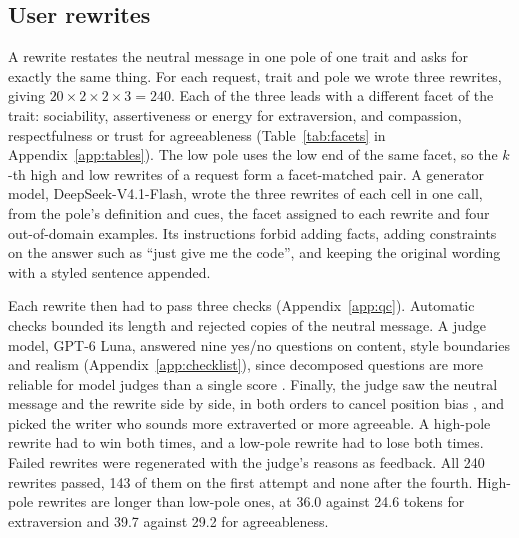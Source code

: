 \subsection{User rewrites}
A rewrite restates the neutral message in one pole of one trait and asks for exactly the same thing. For each request, trait and pole we wrote three rewrites, giving $20 \times 2 \times 2 \times 3 = 240$. Each of the three leads with a different facet of the trait: sociability, assertiveness or energy for extraversion, and compassion, respectfulness or trust for agreeableness (Table~\ref{tab:facets} in Appendix~\ref{app:tables}). The low pole uses the low end of the same facet, so the $k$-th high and low rewrites of a request form a facet-matched pair. A generator model, DeepSeek-V4.1-Flash, wrote the three rewrites of each cell in one call, from the pole's definition and cues, the facet assigned to each rewrite and four out-of-domain examples. Its instructions forbid adding facts, adding constraints on the answer such as ``just give me the code'', and keeping the original wording with a styled sentence appended.


Each rewrite then had to pass three checks (Appendix~\ref{app:qc}). Automatic checks bounded its length and rejected copies of the neutral message. A judge model, GPT-6 Luna, answered nine yes/no questions on content, style boundaries and realism (Appendix~\ref{app:checklist}), since decomposed questions are more reliable for model judges than a single score \citep{cook2024ticking, qin2024infobench, lee2024checkeval}. Finally, the judge saw the neutral message and the rewrite side by side, in both orders to cancel position bias \citep{zheng2023judging}, and picked the writer who sounds more extraverted or more agreeable. A high-pole rewrite had to win both times, and a low-pole rewrite had to lose both times. Failed rewrites were regenerated with the judge's reasons as feedback. All 240 rewrites passed, 143 of them on the first attempt and none after the fourth. High-pole rewrites are longer than low-pole ones, at 36.0 against 24.6 tokens for extraversion and 39.7 against 29.2 for agreeableness. 

